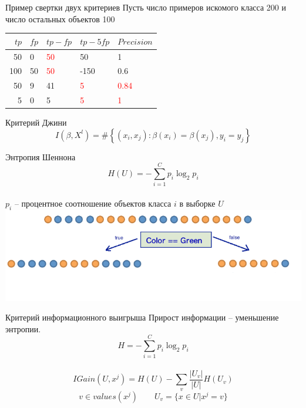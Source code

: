 \documentclass[10pt]{beamer}
\begin{document}
\begin{frame}{Пример свертки двух критериев}
	Пусть число примеров искомого класса 200 и число остальных объектов 100\\
	\bigbreak
	\begin{tabular}{|r l|l|l|l|}
	  \hline 
	  $tp$ & $fp$ & $tp-fp$ & $tp-5fp$ & $Precision$\\ 
	  \hline \hline
	  50 & 0 & \textcolor{red}{50} & 50 & 1\\
	  \hline
	  100 & 50 & \textcolor{red}{50} & -150 & 0.6\\
	  \hline \hline
	  50 & 9 & 41 & \textcolor{red}{5} & \textcolor{red}{0.84}\\
	  \hline  
	  5 & 0 & 5 & \textcolor{red}{5} & \textcolor{red}{1}\\  
	  \hline 
	\end{tabular}
\end{frame}

{
\begin{frame}{Критерий Джини}
  $$I(\beta,X^l)= \# \left\{ (x_i, x_j): \beta(x_i) = \beta(x_j), y_i = y_j \right\}$$
\end{frame}
}

\begin{frame}{Энтропия Шеннона}
  $$H(U) = - \sum\limits_{i=1}^{C} p_i \log_2 p_i$$\\
  $p_i$ -- процентное соотношение объектов класса $i$ в выборке $U$\\
  \pause
  \bigbreak
  \includegraphics[width = \textwidth, keepaspectratio = true]{images/entropy}
\end{frame}

\begin{frame}{Критерий информационного выигрыша}
  \alert{Прирост информации} -- уменьшение энтропии.
  $$H = - \sum\limits_{i=1}^{C} p_i \log_2 p_i$$\\
	$$IGain(U, x^j) = H(U) - \sum \limits_{v} \frac{\vert U_v\vert}{\vert U \vert} H(U_v) $$
  \bigbreak	
	$$v \in values(x^j) \qquad U_v = \{x \in U| x^j=v\}$$
\end{frame}
\end{document}
